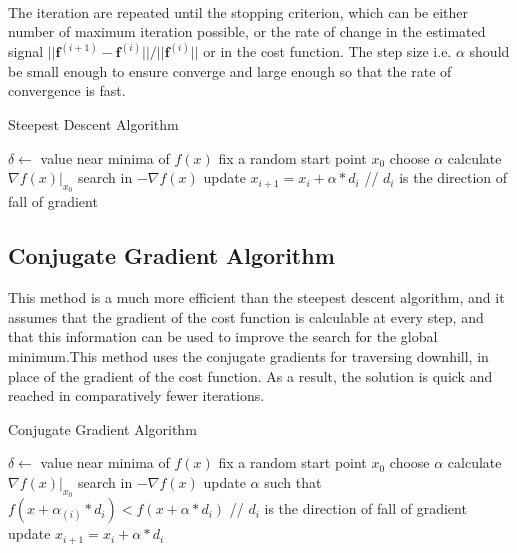 \documentclass[a4paper]{book}
\begin{document}
\paragraph*{}The iteration are repeated until the stopping criterion, which can be either number of maximum iteration possible, or the rate of change in the estimated signal $ ||\textbf{f}^{(i+1)} - \textbf{f}^{(i)}||/||\textbf{f}^{(i)}||$ or in the cost function. The step size i.e. $ \alpha $ should be small enough to ensure converge and large enough so that the rate of convergence is fast.
\begin{algorithm}[h!]
	\caption{Steepest Descent Algorithm}
	\label{alg1}
	\begin{algorithmic}
		\STATE $ \delta \leftarrow$ value near minima of  $f(x) $ 
		\STATE fix a random start point  $ x_{0} $
		\STATE choose  $ \alpha $ 
		\STATE	calculate $ \nabla f(x) |_{x_{0}}$
		\STATE search in $ - \nabla f(x)$
		\STATE update $ x_{i+1} = x_{i} + \alpha*d_{i} $  // $ d_{i} $  is the direction of fall of gradient
		\ENDIF
		\end{algorithmic}
	
\end{algorithm}



\subsection{Conjugate Gradient Algorithm}
This method is a much more efficient than the steepest descent algorithm,
and it assumes that the gradient of the cost function is calculable at every step, and that this information can be used to improve the search for the global minimum.This method uses the conjugate gradients for traversing
downhill, in place of the gradient of the cost function. As a result, the solution is
quick and reached in comparatively fewer iterations.
\begin{algorithm}[h!]
	\caption{Conjugate Gradient Algorithm}
	\label{alg2}
	\begin{algorithmic}
		\STATE $ \delta \leftarrow$ value near minima of  $f(x) $ 
		\STATE fix a random start point  $ x_{0} $
		\STATE choose  $ \alpha $ 
		\IF {$ f(x) \geq \delta $}
		\STATE	calculate $ \nabla f(x) |_{x_{0}}$
		\STATE search in $ - \nabla f(x)$
		\STATE update $ \alpha $ such that $ f(x + \alpha_{(i)}*d_{i}) < f(x + \alpha*d_{i})$  // $ d_{i} $  is the direction of fall of gradient
		\STATE update $ x_{i+1} = x_{i} + \alpha*d_{i} $  
		\ENDIF
	\end{algorithmic}
	
\end{algorithm}
\end{document}
